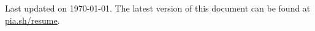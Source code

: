 \documentclass[10pt,a4paper,ragged2e]{altacv}
\begin{document}
\begin{fullwidth}

\medskip
\medskip
\medskip
\medskip

Last updated on \today. The latest version of this document can be found at \href{https://pia.sh/resume}{\underline{pia.sh/resume}}.

\end{fullwidth}






\nocite{*}





\end{document}
